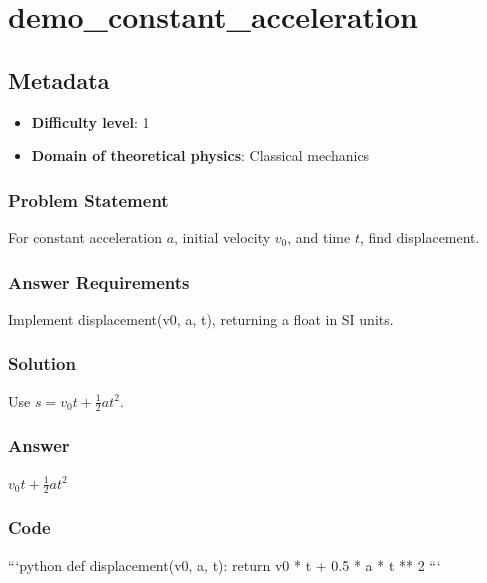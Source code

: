 \chapter{demo_constant_acceleration}
\section{Metadata}
\begin{itemize}
\item \textbf{Difficulty level}: 1
\item \textbf{Domain of theoretical physics}: Classical mechanics
\end{itemize}
\subsection{Problem Statement}
For constant acceleration $a$, initial velocity $v_0$, and time $t$, find displacement.
\subsection{Answer Requirements}
Implement displacement(v0, a, t), returning a float in SI units.
\subsection{Solution}
Use $s=v_0t+\frac{1}{2}at^2$.
\subsection{Answer}
$v_0t+\frac{1}{2}at^2$
\subsection{Code}
```python
def displacement(v0, a, t):
    return v0 * t + 0.5 * a * t ** 2
```
